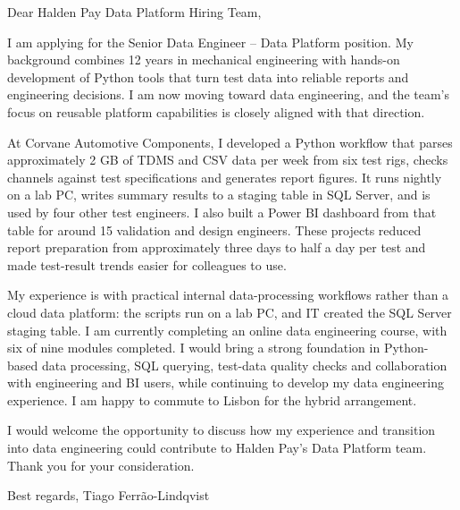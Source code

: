 \documentclass[11pt,a4paper]{article}
\begin{document}
Dear Halden Pay Data Platform Hiring Team,

I am applying for the Senior Data Engineer – Data Platform position. My background combines 12 years in mechanical engineering with hands-on development of Python tools that turn test data into reliable reports and engineering decisions. I am now moving toward data engineering, and the team's focus on reusable platform capabilities is closely aligned with that direction.

At Corvane Automotive Components, I developed a Python workflow that parses approximately 2 GB of TDMS and CSV data per week from six test rigs, checks channels against test specifications and generates report figures. It runs nightly on a lab PC, writes summary results to a staging table in SQL Server, and is used by four other test engineers. I also built a Power BI dashboard from that table for around 15 validation and design engineers. These projects reduced report preparation from approximately three days to half a day per test and made test-result trends easier for colleagues to use.

My experience is with practical internal data-processing workflows rather than a cloud data platform: the scripts run on a lab PC, and IT created the SQL Server staging table. I am currently completing an online data engineering course, with six of nine modules completed. I would bring a strong foundation in Python-based data processing, SQL querying, test-data quality checks and collaboration with engineering and BI users, while continuing to develop my data engineering experience. I am happy to commute to Lisbon for the hybrid arrangement.

I would welcome the opportunity to discuss how my experience and transition into data engineering could contribute to Halden Pay's Data Platform team. Thank you for your consideration.

Best regards,
Tiago Ferrão-Lindqvist
\end{document}
